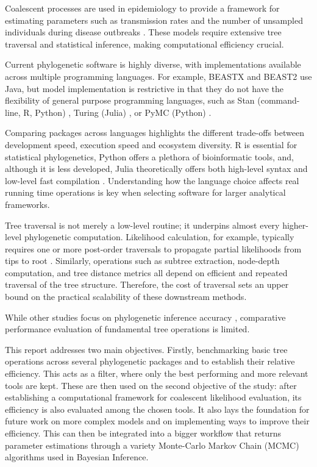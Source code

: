 \documentclass[11pt, a4paper]{article}
\begin{document}
Coalescent processes are used in epidemiology to provide a framework for estimating parameters such as transmission rates and the number of unsampled individuals during disease outbreaks \cite{volz2009,pybus2001}. These models require extensive tree traversal and statistical inference, making computational efficiency crucial.

Current phylogenetic software is highly diverse, with implementations available across multiple programming languages. For example, BEASTX and BEAST2 \cite{drummond2007beast, bouckaert2019beast2} use Java, but model implementation is restrictive in that they do not have the flexibility of general purpose programming languages, such as Stan (command-line, R, Python) \cite{carpenter2017stan}, Turing (Julia) \cite{ge2018turing}, or PyMC (Python) \cite{salvatier2016pymc}.

Comparing packages across languages highlights the different trade-offs between development speed, execution speed and ecosystem diversity. R is essential for statistical phylogenetics, Python offers a plethora of bioinformatic tools, and, although it is less developed, Julia theoretically offers both high-level syntax and low-level fast compilation \cite{bezanson2017julia}. Understanding how the language choice affects real running time operations is key when selecting software for larger analytical frameworks. 

Tree traversal is not merely a low-level routine; it underpins almost every higher-level phylogenetic computation. Likelihood calculation, for example, typically requires one or more post-order traversals to propagate partial likelihoods from tips to root \cite{felsenstein1981evolutionary}. Similarly, operations such as subtree extraction, node-depth computation, and tree distance metrics all depend on efficient and repeated traversal of the tree structure. Therefore, the cost of traversal sets an upper bound on the practical scalability of these downstream methods. 

While other studies focus on phylogenetic inference accuracy \cite{hoehler2025phylosmew}, comparative performance evaluation of fundamental tree operations is limited.

This report addresses two main objectives. Firstly, benchmarking basic tree operations across several phylogenetic packages and to establish their relative efficiency. This acts as a filter, where only the best performing and more relevant tools are kept. These are then used on the second objective of the study: after establishing a computational framework for coalescent likelihood evaluation, its efficiency is also evaluated among the chosen tools. 
It also lays the foundation for future work on more complex models and on implementing ways to improve their efficiency. This can then be integrated into a bigger workflow that returns parameter estimations through a variety Monte-Carlo Markov Chain (MCMC) algorithms used in Bayesian Inference.
\end{document}
